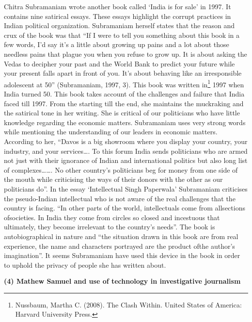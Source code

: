 \begin{multicols}{2}
\noi
Chitra Subramaniam wrote another book called ‘India is for sale’ in 1997. It contains nine
satirical essays. These essays highlight the corrupt practices in Indian political organization.
Subramaniam herself states that the reason and crux of the book was that “If I were to tell you
something about this book in a few words, I’d say it’s a little about growing up pains and a lot
about those needless pains that plague you when you refuse to grow up. It is about asking the
Vedas to decipher your past and the World Bank to predict your future while your present falls
apart in front of you. It’s about behaving like an irresponsible adolescent at 50” (Subramaniam,
1997, 3). This book was written in\footnote{Nussbaum, Martha C. (2008). The Clash Within. United States of America: Harvard University Press.} 1997 when India turned 50. This book takes account of
the challenges and failure that India faced till 1997. From the starting till the end, she maintains
the muckraking and the satirical tone in her writing. She is critical of our politicians who have
little knowledge regarding the economic matters. Subramaniam uses very strong words while mentioning the understanding of our leaders in economic matters. According to her, “Davos is
a big showroom where you display your country, your industry, and your services…. To this
forum India sends politicians who are armed not just with their ignorance of Indian and
international politics but also long list of complexes……. No other country’s politicians beg
for money from one side of the mouth while criticising the ways of their donors with the other
as our politicians do”. In the essay ‘Intellectual Singh Paperwala’ Subramaniam criticises the
pseudo-Indian intellectual who is not aware of the real challenges that the country is facing.
“In other parts of the world, intellectuals come from allsections ofsocieties. In India they come
from circles so closed and incestuous that ultimately, they become irrelevant to the country’s
needs”. The book is autobiographical in nature and “the situation drawn in this book are from
real experience, the name and characters portrayed are the product ofthe author’s imagination”.
It seems Subramaniam have used this device in the book in order to uphold the privacy of
people she has written about.


\noi
{\large \bfseries (4) Mathew Samuel and use of technology in investigative journalism}

\vspace{-.1cm}


\end{multicols}
